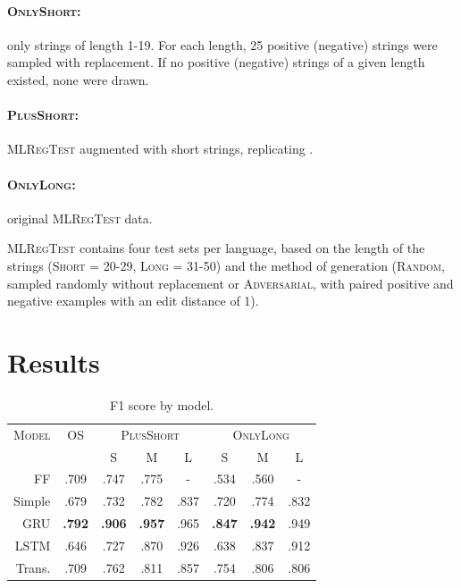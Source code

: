 \documentclass[11pt]{article}
\newcommand{\todo}[1]{\textcolor{red}{(TODO: {#1})}}
\begin{document}
\paragraph{\textsc{OnlyShort}:}  only strings of length 1-19.
For each length, 25 positive (negative) strings were sampled with replacement.
If no positive (negative) strings of a given length existed, none were drawn.
\vspace{-1.2em}
\paragraph{\textsc{PlusShort}:} \textsc{MLRegTest}  augmented with short strings, replicating \citet{adil23}.
\vspace{-1.2em}
\paragraph{\textsc{OnlyLong}:}  original \textsc{MLRegTest} data.

\textsc{MLRegTest} 
contains four test sets per language, based on the length of the strings (\textsc{Short} = 20-29, \textsc{Long} = 31-50) and the method of generation (\textsc{Random}, sampled randomly without replacement or \textsc{Adversarial}, with paired positive and negative examples with an edit distance of 1). 


\section{Results} \label{sec:results}

\begin{table}[t!]
\begin{scriptsize}
\centering
\begin{tabular}{|r|c|c|c|c|c|c|c|}
\hline
\textsc{Model} & \textsc{OS} & \multicolumn{3}{|c|}{\textsc{PlusShort}} & \multicolumn{3}{|c|}{\textsc{OnlyLong}}\\
& & S & M & L & S & M & L \\
\hline \hline
FF & .709 & .747 & .775 & - & .534 & .560 &  - \\
\hline
Simple & .679 & .732 & .782 & .837& .720 & .774 & .832 \\
\hline
GRU & \textbf{.792} & \textbf{.906} & \textbf{.957} & .965 & \textbf{.847} & \textbf{.942} & .949 \\
\hline
LSTM & .646 & .727 & .870 &  .926 & .638 & .837 & .912 \\
\hline
Trans. & .709 & .762 & .811 & .857 & .754 & .806 & .806 \\
\hline
\end{tabular}
\end{scriptsize}
\caption{F1 score by model.}
\label{tab:overall-scores}
\end{table}
\end{document}
